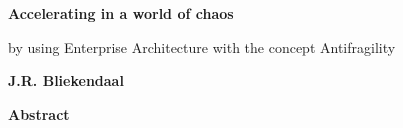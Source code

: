 \thispagestyle{plain}
{}
\begin{center}
	\Large
	\textbf{Accelerating in a world of chaos}
	
	\vspace{0.4cm}
	\large
	by using Enterprise Architecture with the concept Antifragility
	
	\vspace{0.4cm}
	\textbf{J.R. Bliekendaal}
	
	\vspace{0.9cm}
	\textbf{Abstract}
\end{center}

\lipsum[1]